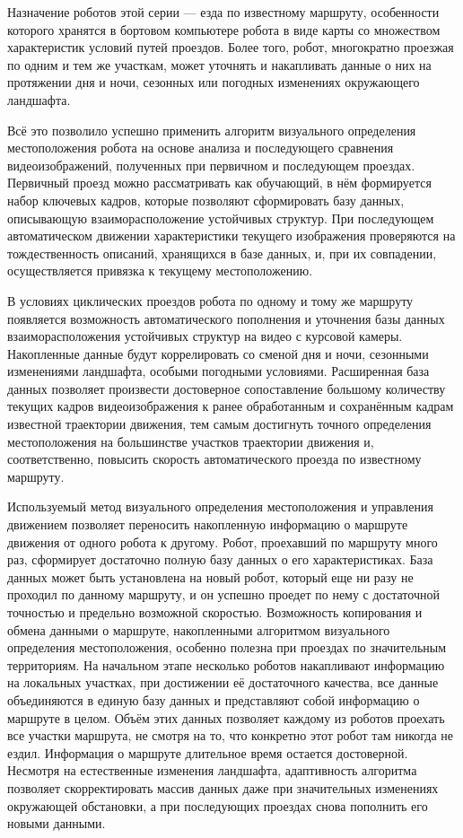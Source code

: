 Назначение роботов этой серии — езда по известному маршруту, особенности которого хранятся в бортовом компьютере робота в виде карты со множеством характеристик условий путей проездов. Более того, робот, многократно проезжая по одним и тем же участкам, может уточнять и накапливать данные о них на протяжении дня и ночи, сезонных или погодных изменениях окружающего ландшафта.

Всё это позволило успешно применить алгоритм визуального определения местоположения робота на основе анализа и последующего сравнения видеоизображений, полученных при первичном и последующем проездах.
Первичный проезд можно рассматривать как обучающий, в нём формируется набор ключевых кадров, которые позволяют сформировать базу данных, описывающую взаиморасположение устойчивых структур. При последующем автоматическом движении характеристики текущего изображения проверяются на тождественность описаний, хранящихся в базе данных, и, при их совпадении, осуществляется привязка к текущему местоположению.

В условиях циклических проездов робота по одному и тому же маршруту появляется возможность автоматического пополнения и уточнения базы данных взаиморасположения устойчивых структур на видео с курсовой камеры. Накопленные данные будут коррелировать со сменой дня и ночи, сезонными изменениями ландшафта, особыми погодными условиями. Расширенная база данных позволяет произвести достоверное сопоставление большому количеству текущих кадров видеоизображения к ранее обработанным и сохранённым кадрам известной траектории движения, тем самым достигнуть точного определения местоположения на большинстве участков траектории движения и, соответственно, повысить скорость автоматического проезда по известному маршруту.

Используемый метод визуального определения местоположения и управления движением позволяет переносить накопленную информацию о маршруте движения от одного робота к другому. Робот, проехавший по маршруту много раз, сформирует достаточно полную базу данных о его характеристиках. База данных может быть установлена на новый робот, который еще ни разу не проходил по данному маршруту, и он успешно проедет по нему с достаточной точностью и предельно возможной скоростью.
Возможность копирования и обмена данными о маршруте, накопленными алгоритмом визуального определения местоположения, особенно полезна при проездах по значительным территориям. На начальном этапе несколько роботов накапливают информацию на локальных участках, при достижении её достаточного качества, все данные объединяются в единую базу данных и представляют собой информацию о маршруте в целом. Объём этих данных позволяет каждому из роботов проехать все участки маршрута, не смотря на то, что конкретно этот робот там никогда не ездил. Информация о маршруте длительное время остается достоверной. Несмотря на естественные изменения ландшафта, адаптивность алгоритма позволяет скорректировать массив данных даже при значительных изменениях окружающей обстановки, а при последующих проездах снова пополнить его новыми данными.

